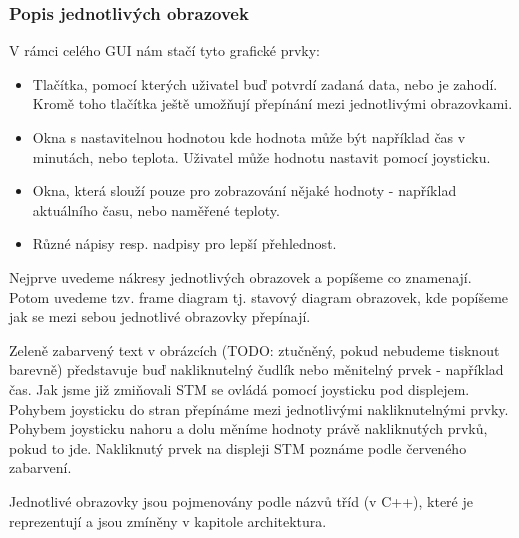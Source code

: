 \subsubsection{Popis jednotlivých obrazovek}

V rámci celého GUI nám stačí tyto grafické prvky:
\begin{itemize}
  \item Tlačítka, pomocí kterých uživatel buď potvrdí zadaná data, nebo je zahodí.
    Kromě toho tlačítka ještě umožňují přepínání mezi jednotlivými obrazovkami.
  \item Okna s nastavitelnou hodnotou kde hodnota může být například čas v minutách, nebo teplota.
    Uživatel může hodnotu nastavit pomocí joysticku.
  \item Okna, která slouží pouze pro zobrazování nějaké hodnoty - například aktuálního času, nebo
    naměřené teploty.
  \item Různé nápisy resp. nadpisy pro lepší přehlednost.
\end{itemize}

Nejprve uvedeme nákresy jednotlivých obrazovek a popíšeme co znamenají.
Potom uvedeme tzv. frame diagram tj. stavový diagram obrazovek, kde popíšeme jak se mezi sebou
jednotlivé obrazovky přepínají.

Zeleně zabarvený text v obrázcích (TODO: ztučněný, pokud nebudeme tisknout barevně) představuje
buď nakliknutelný čudlík nebo měnitelný prvek - například čas.
Jak jsme již zmiňovali STM se ovládá pomocí joysticku pod displejem.
Pohybem joysticku do stran přepínáme mezi jednotlivými nakliknutelnými prvky.
Pohybem joysticku nahoru a dolu měníme hodnoty právě nakliknutých prvků, pokud to jde.
Nakliknutý prvek na displeji STM poznáme podle červeného zabarvení.

Jednotlivé obrazovky jsou pojmenovány podle názvů tříd (v C++), které je reprezentují a jsou zmíněny
v kapitole architektura.

